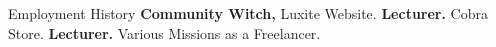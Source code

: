 \begin{rubric}{Employment History}
    \textbf{Community Witch,} Luxite Website.
    \entry*[2013 -- 2015]%
    \textbf{Lecturer.} Cobra Store.
    \entry*[2013 -- 2015]%
    \textbf{Lecturer.} Various Missions as a Freelancer.
\end{rubric}